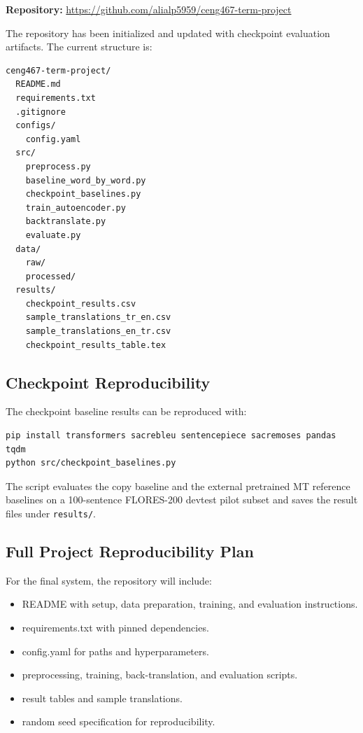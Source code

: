 \documentclass[11pt]{article}
\begin{document}
\textbf{Repository:} \url{https://github.com/alialp5959/ceng467-term-project}

The repository has been initialized and updated with checkpoint evaluation artifacts. The current structure is:

\begin{verbatim}
ceng467-term-project/
  README.md
  requirements.txt
  .gitignore
  configs/
    config.yaml
  src/
    preprocess.py
    baseline_word_by_word.py
    checkpoint_baselines.py
    train_autoencoder.py
    backtranslate.py
    evaluate.py
  data/
    raw/
    processed/
  results/
    checkpoint_results.csv
    sample_translations_tr_en.csv
    sample_translations_en_tr.csv
    checkpoint_results_table.tex
\end{verbatim}

\subsection{Checkpoint Reproducibility}

The checkpoint baseline results can be reproduced with:

\begin{verbatim}
pip install transformers sacrebleu sentencepiece sacremoses pandas tqdm
python src/checkpoint_baselines.py
\end{verbatim}

The script evaluates the copy baseline and the external pretrained MT reference baselines on a 100-sentence FLORES-200 devtest pilot subset and saves the result files under \texttt{results/}.

\subsection{Full Project Reproducibility Plan}

For the final system, the repository will include:
\begin{itemize}
    \item README with setup, data preparation, training, and evaluation instructions.
    \item requirements.txt with pinned dependencies.
    \item config.yaml for paths and hyperparameters.
    \item preprocessing, training, back-translation, and evaluation scripts.
    \item result tables and sample translations.
    \item random seed specification for reproducibility.
\end{itemize}
\end{document}
